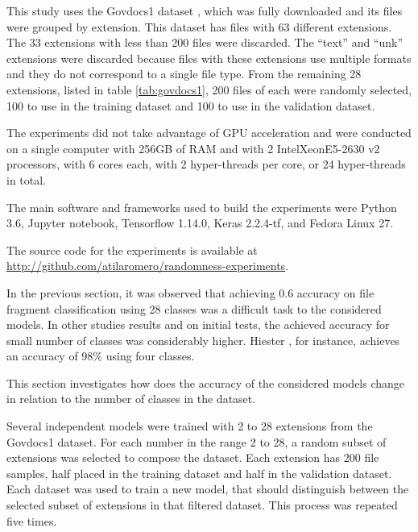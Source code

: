 
This study uses the Govdocs1 dataset \cite{garfinkel_bringing_2009}, which was fully downloaded and its files were grouped by extension. This dataset has files with 63 different extensions. The 33 extensions with less than 200 files were discarded. The  ``text'' and ``unk'' extensions were discarded because files with these extensions use multiple formats and they do not correspond to a single file type. From the remaining 28 extensions, listed in table \ref{tab:govdocs1}, 200 files of each were randomly selected, 100 to use in the training dataset and 100 to use in the validation dataset.



The experiments did not take advantage of GPU acceleration and were  conducted on a single computer with 256GB of RAM and with 2 Intel\textregistered Xeon\textregistered E5-2630 v2 processors, with 6 cores each, with 2 hyper-threads per core, or 24 hyper-threads in total. 


The main software and frameworks used to build the experiments were Python 3.6, Jupyter notebook, Tensorflow 1.14.0, Keras 2.2.4-tf, and Fedora Linux 27.

The source code for the experiments is available at \sloppy\url{http://github.com/atilaromero/randomness-experiments}.

In the previous section, it was observed that achieving 0.6 accuracy on file fragment classification using 28 classes was a difficult task to the considered models. In other studies results \cite{hiester_file_2018} \cite{sportiello_context-based_2012} \cite{amirani_feature-based_2013} \cite{maslim_distributed_2014} and on initial tests, the achieved accuracy for small number of classes was considerably higher. Hiester \cite{hiester_file_2018}, for instance, achieves an accuracy of 98\% using four classes.

This section investigates how does the accuracy of the considered models change in relation to the number of classes in the dataset.


Several independent models were trained with 2 to 28 extensions from the Govdocs1 dataset. For each number in the range 2 to 28, a random subset of extensions was selected to compose the dataset. Each extension has 200 file samples, half placed in the training dataset and half in the validation dataset. Each dataset was used to train a new model, that should distinguish between the selected subset of extensions in that filtered dataset. This process was repeated five times.



